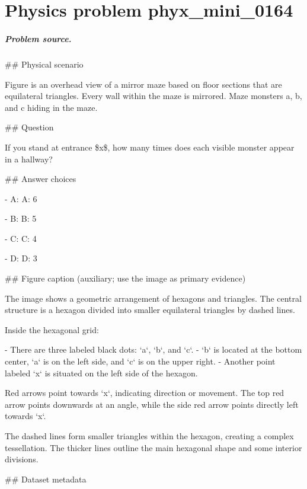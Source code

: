 
\chapter{Physics problem phyx\_mini\_0164}
\label{ch:PhyXMiniProblems_problem_phyx_mini_0164}

\paragraph{Problem source.}
\#\# Physical scenario

Figure is an overhead view of a mirror maze based on floor sections that are equilateral triangles. Every wall within the maze is mirrored. Maze monsters a, b, and c hiding in the maze.

\#\# Question

If you stand at entrance \$x\$, how many times does each visible monster appear in a hallway?

\#\# Answer choices

- A: A: 6

- B: B: 5

- C: C: 4

- D: D: 3

\#\# Figure caption (auxiliary; use the image as primary evidence)

The image shows a geometric arrangement of hexagons and triangles. The central structure is a hexagon divided into smaller equilateral triangles by dashed lines. 

Inside the hexagonal grid:

- There are three labeled black dots: `a`, `b`, and `c`.
- `b` is located at the bottom center, `a` is on the left side, and `c` is on the upper right.
- Another point labeled `x` is situated on the left side of the hexagon.

Red arrows point towards `x`, indicating direction or movement. The top red arrow points downwards at an angle, while the side red arrow points directly left towards `x`. 

The dashed lines form smaller triangles within the hexagon, creating a complex tessellation. The thicker lines outline the main hexagonal shape and some interior divisions.

\#\# Dataset metadata

